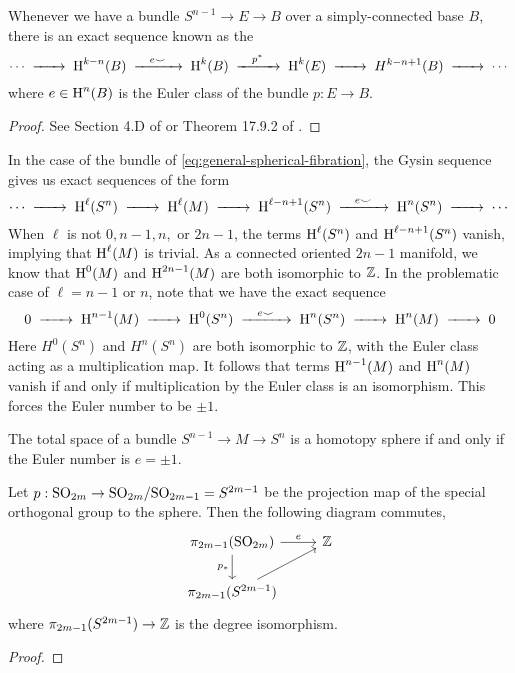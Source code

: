 \begin{theorem}
	Whenever we have a bundle $S^{n-1} \to E\to B$ over a simply-connected base $B$, there is an exact sequence known as the  
	\[
		\cdots \lkxto \H^{k-n}(B)\lkxto[e\smile] \H^k(B)\lkxto[p^*] \H^k(E)\lkxto H^{k-n+1}(B)\lkxto \cdots
	\]
	where $e\in \operatorname{H}^n(B)$ is the Euler class of the bundle $p : E \to B$.
\end{theorem}
\begin{proof}
	See Section 4.D of \cite{hatcher2002topology} or Theorem 17.9.2 of \cite{dieck2008algebraic}.
\end{proof}

In the case of the bundle of \cref{eq:general-spherical-fibration}, the Gysin sequence gives us exact sequences of the form
\[
	\cdots \lkxto \H^\ell(S^n) \lkxto \H^{\ell}(M) \lkxto \H^{\ell - n+1}(S^n) \lkxto[e\smile] \H^n(S^n) \lkxto \cdots
\]
When $\ell$ is not $0,n-1,n,$ or $2n-1$, the terms $\operatorname{H}^\ell(S^n)$ and $\operatorname{H}^{\ell - n+1}(S^n)$ vanish, implying that $\operatorname{H}^\ell(M)$ is trivial. As a connected oriented $2n-1$ manifold, we know that $\operatorname{H}^0(M)$ and $\operatorname{H}^{2n-1}(M)$ are both isomorphic to $\mathbb{Z}$. In the problematic case of $\ell = n-1$ or $n$, note that we have the exact sequence
\[
	 0 \lkxto \H^{n-1}(M) \lkxto \H^0(S^n) \lkxto[e\smile] \H^n(S^n) \lkxto \H^n(M) \lkxto 0
\]
Here $H^0(S^n)$ and $H^n(S^n)$ are both isomorphic to $\mathbb{Z}$, with the Euler class acting as a multiplication map. It follows that terms $\operatorname{H}^{n-1}(M)$ and $\operatorname{H}^n(M)$ vanish if and only if multiplication by the Euler class is an isomorphism. This forces the Euler number to be $\pm 1$.

\begin{proposition}\label{prop:homotopy-type-spherical-bundle}
	The total space of a bundle $S^{n-1} \to M \to S^n$ is a homotopy sphere if and only if the Euler number is $e=\pm 1$.
\end{proposition}

\begin{remark}
\end{remark}

\begin{theorem}\label{thm:euler-number-of-vector-bundle-over-sphere}
	Let $p : \mathrm{SO}_{2m} \to \mathrm{SO}_{2m}/\mathrm{SO}_{2m-1}= S^{2m-1}$ be the projection map of the special orthogonal group to the sphere. Then the following diagram commutes,
	\[\begin{tikzcd}
			{\pi_{2m-1}(\SO_{2m})} & \Z \\
			{\pi_{2m-1}(S^{2m-1})}
			\arrow["e", from=1-1, to=1-2]
			\arrow["{p_*}"', from=1-1, to=2-1]
			\arrow[from=2-1, to=1-2]
		\end{tikzcd}\]
	where $\pi_{2m-1}(S^{2m-1})\to \mathbb{Z}$ is the degree isomorphism.
\end{theorem}
\begin{proof}
\end{proof}

